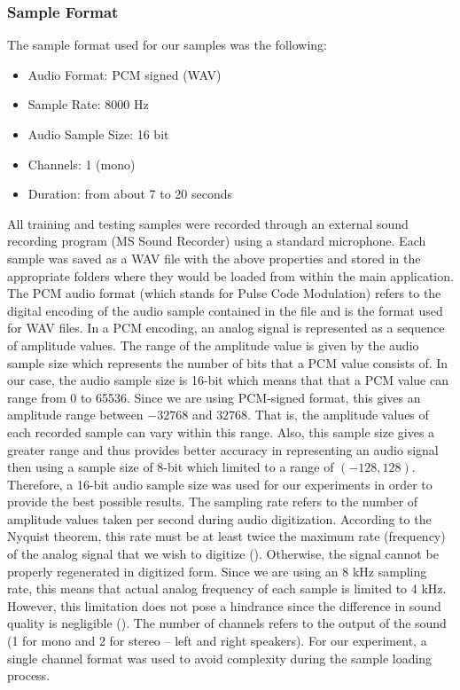 \subsubsection{Sample Format}

The sample format used for our samples was the following:

\begin{itemize}
	\item Audio Format: PCM signed (WAV)
	\item Sample Rate: 8000 Hz
	\item Audio Sample Size: 16 bit
	\item Channels: 1 (mono)
	\item Duration: from about 7 to 20 seconds
\end{itemize}

All training and testing samples were recorded through an external sound recording
program (MS Sound Recorder) using a standard microphone. Each sample was
saved as a WAV file with the above properties and stored in the appropriate folders
where they would be loaded from within the main application. The PCM audio format
(which stands for Pulse Code Modulation) refers to the digital encoding of the audio
sample contained in the file and is the format used for WAV files. In a PCM
encoding, an analog signal is represented as a sequence of amplitude values. The
range of the amplitude value is given by the audio sample size which represents the
number of bits that a PCM value consists of. In our case, the audio sample size is
16-bit which means that that a PCM value can range from 0 to 65536. Since we are
using PCM-signed format, this gives an amplitude range between $-32768$ and $32768$.
That is, the amplitude values of each recorded sample can vary within this range.
Also, this sample size gives a greater range and thus provides better accuracy in
representing an audio signal then using a sample size of 8-bit which limited to a
range of $(-128, 128)$. Therefore, a 16-bit audio sample size was used for our
experiments in order to provide the best possible results. The sampling rate refers
to the number of amplitude values taken per second during audio digitization.
According to the Nyquist theorem, this rate must be at least twice the maximum rate
(frequency) of the analog signal that we wish to digitize (\cite{jervis}). Otherwise, the signal
cannot be properly regenerated in digitized form. Since we are using an 8 kHz
sampling rate, this means that actual analog frequency of each sample is limited to
4 kHz. However, this limitation does not pose a hindrance since the difference in
sound quality is negligible (\cite{shaughnessy2000}). The number of channels
refers to the output of the sound (1 for mono and 2 for stereo -- left and right
speakers). For our experiment, a single channel format was used to avoid complexity
during the sample loading process.

